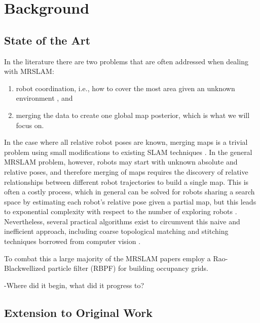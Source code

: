 \section{Background}
\label{S:Back}

\subsection{State of the Art}
\label{SS:Back:SOA}
    
In the literature there are two problems that are often addressed when dealing with MRSLAM:
\begin{enumerate}
\item robot coordination, i.e., how to cover the most area given an unknown environment \cite{julia2012comparison}, and
\item merging the data to create one global map posterior, which is what we will focus on.
\end{enumerate}

In the case where all relative robot poses are known, merging maps is a trivial problem using small modifications to existing SLAM techniques \cite{thrun2001probabilistic}. In the general MRSLAM problem, however, robots may start with unknown absolute and relative poses, and therefore merging of maps requires the discovery of relative relationships between different robot trajectories to build a single map. This is often a costly process, which in general can be solved for robots sharing a search space by estimating each robot's relative pose given a partial map, but this leads to exponential complexity with respect to the number of exploring robots \cite{fox2006distributed}. Nevertheless, several practical algorithms exist to circumvent this naive and inefficient approach,  including coarse topological matching and stitching techniques borrowed from computer vision \cite{birk2006merging}.

To combat this a large majority of the MRSLAM papers employ a Rao-Blackwellized particle filter (RBPF) for building occupancy grids.


\cite{howard2006multi,birk2006merging,lazaro2013multi,lee2012probabilistic}


-Where did it begin, what did it progress to?




\subsection{\cite{howard2006multi} Extension to Original Work}
\label{SS:Back:Contributions}


